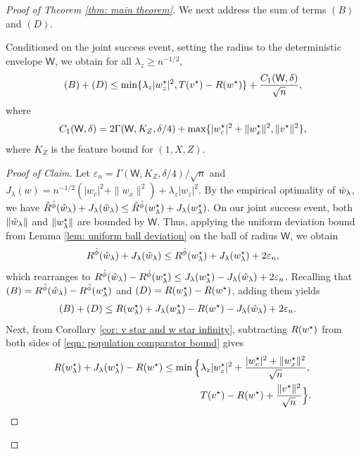 \begin{proof}[Proof of Theorem \ref{thm: main theorem}]
    We next address the sum of terms $(B)$ and $(D)$.
    \begin{claim}
    Conditioned on the joint success event, setting the radius to the deterministic envelope $\mathsf{W}$, we obtain for all $\lambda_z \geq n^{-1/2}$,
    \[
    (B)+(D)\leq
    \min\{\lambda_z|w_z^\star|^2,T(v^\star)-R(w^\star)\}
    +\frac{C_1(\mathsf{W},\delta)}{\sqrt n},
    \]
    where
    \[
     C_1(\mathsf{W},\delta)=2\Gamma(\mathsf{W},K_Z,\delta/4)
     +\max\{|w_c^\star|^2+\|w_x^\star\|^2,\|v^\star\|^2\},
     \]
     where $K_Z$ is the feature bound for $(1,X,Z)$.
    \end{claim}
    \begin{proof}[Proof of Claim]
    Let $\varepsilon_n=\Gamma(\mathsf{W},K_Z,\delta/4)/\sqrt n$ and
    $J_\lambda(w)=n^{-1/2}(|w_c|^2+\|w_x\|^2)+\lambda_z|w_z|^2$.
    By the empirical optimality of $\hat{w}_\lambda$, we have $\hat{R}^{\hat{\phi}}(\hat{w}_\lambda)+J_\lambda(\hat{w}_\lambda) \leq \hat{R}^{\hat{\phi}}(w^\star_{\lambda})+J_\lambda(w^\star_{\lambda})$. On our joint success event, both $\|\hat{w}_\lambda\|$ and $\|w^\star_{\lambda}\|$ are bounded by $\mathsf{W}$. Thus, applying the uniform deviation bound from Lemma \ref{lem: uniform ball deviation} on the ball of radius $\mathsf{W}$, we obtain
    \begin{equation}\label{eqn: replacing w hat with w lambda star}
    R^{\hat{\phi}}(\hat{w}_\lambda)+J_\lambda(\hat{w}_\lambda)
    \leq R^{\hat{\phi}}(w^\star_{\lambda})+J_\lambda(w^\star_{\lambda})+2\varepsilon_n,
    \end{equation}
    which rearranges to $R^{\hat{\phi}}(\hat{w}_\lambda) - R^{\hat{\phi}}(w^\star_{\lambda}) \leq J_\lambda(w^\star_{\lambda}) - J_\lambda(\hat{w}_\lambda) + 2\varepsilon_n$.
    Recalling that $(B) = R^{\hat{\phi}}(\hat{w}_\lambda) - R^{\hat{\phi}}(w^\star_{\lambda})$ and $(D) = R(w^\star_{\lambda}) - R(w^\star)$, adding them yields
    \begin{equation}\label{eqn: imputed risk of whl - imputed risk of wsl}
    \begin{aligned}
    (B)+(D) &\leq R(w^\star_{\lambda})+J_\lambda(w^\star_{\lambda})-R(w^\star) - J_\lambda(\hat{w}_\lambda) + 2\varepsilon_n.
    \end{aligned}
    \end{equation}
    Next, from Corollary \ref{cor: v star and w star infinity}, subtracting $R(w^\star)$ from both sides of \eqref{eqn: population comparator bound} gives
    \begin{equation}\label{eqn: risk of whl minus risk of ws}
    \begin{aligned}
    R(\wsl)+J_\lambda(\wsl)-R(\ws)
    \leq\min\Big\{&
       \lambda_z|w_z^\star|^2+
       \frac{|w_c^\star|^2+\|w_x^\star\|^2}{\sqrt n},\\
       &T(\vs)-R(\ws)+\frac{\|\vs\|^2}{\sqrt n}\Big\}.
    \end{aligned}

\end{equation}
\end{proof}
\end{proof}
